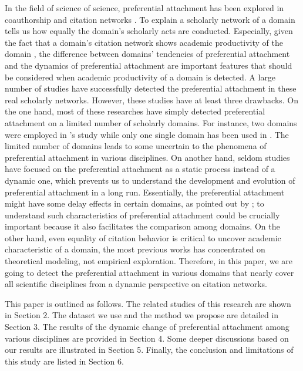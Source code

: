 \documentclass{article}
\begin{document}
In the field of science of science, preferential attachment has been explored in coauthorship and citation networks \cite{milojevic2010modes}\cite{wang2009effect}. To explain a scholarly network of a domain tells us how equally the domain’s scholarly acts are conducted. Especially, given the fact that a domain’s citation network shows academic productivity of the domain \cite{eom2011characterizing}, the difference between domains’ tendencies of preferential attachment and the dynamics of preferential attachment are important features that should be considered when academic productivity of a domain is detected. A large number of studies have successfully detected the preferential attachment in these real scholarly networks. However, these studies have at least three drawbacks. On the one hand, most of these researches have simply detected preferential attachment on a limited number of scholarly domains. For instance, two domains were employed in \cite{barabasi2002evolution}’s study while only one single domain has been used in \cite{milojevic2010modes}. The limited number of domains leads to some uncertain to the phenomena of preferential attachment in various disciplines. On another hand, seldom studies have focused on the preferential attachment as a static process instead of a dynamic one, which prevents us to understand the development and evolution of preferential attachment in a long run. Essentially, the preferential attachment might have some delay effects in certain domains, as pointed out by \cite{sinha2015overview}; to understand such characteristics of preferential attachment could be crucially important because it also facilitates the comparison among domains. On the other hand, even equality of citation behavior is critical to uncover academic characteristic of a domain, the most previous works has concentrated on theoretical modeling, not empirical exploration. Therefore, in this paper, we are going to detect the preferential attachment in various domains that nearly cover all scientific disciplines from a dynamic perspective on citation networks. 

This paper is outlined as follows. The related studies of this research are shown in Section 2. The dataset we use and the method we propose are detailed in Section 3. The results of the dynamic change of preferential attachment among various disciplines are provided in Section 4. Some deeper discussions based on our results are illustrated in Section 5. Finally, the conclusion and limitations of this study are listed in Section 6. 
\end{document}
